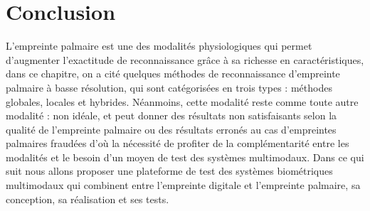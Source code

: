 \section{Conclusion} 
L’empreinte palmaire est une des modalités physiologiques qui permet d’augmenter l’exactitude de reconnaissance grâce à sa richesse en caractéristiques, dans ce chapitre, on a cité quelques méthodes de reconnaissance d’empreinte palmaire à basse résolution, qui sont catégorisées en trois types : méthodes globales, locales et hybrides. Néanmoins, cette modalité reste comme toute autre modalité : non idéale, et peut donner des résultats non satisfaisants selon la qualité de l’empreinte palmaire ou des résultats erronés au cas d’empreintes palmaires fraudées d’où la nécessité de profiter de la complémentarité entre les modalités et le besoin d’un moyen de test des systèmes multimodaux. Dans ce qui suit nous allons proposer une plateforme de test des systèmes biométriques multimodaux qui combinent entre l’empreinte digitale et l’empreinte palmaire, sa conception, sa réalisation et ses tests.
